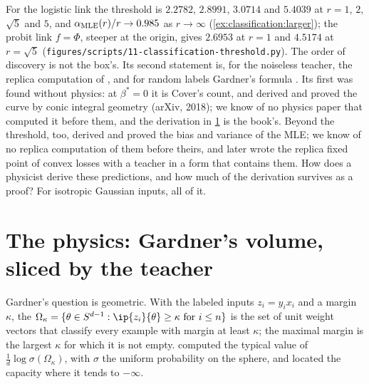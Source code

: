 \begin{refsection}
For the logistic link the threshold is $2.2782$, $2.8991$, $3.0714$ and $5.4039$ at $r=1$, $2$, $\sqrt5$ and $5$, and $\alpha_{\mathrm{MLE}}(r)/r\to0.985$ as $r\to\infty$ (\cref{ex:classification:larger}); the probit link $f=\Phi$, steeper at the origin, gives $2.6953$ at $r=1$ and $4.5174$ at $r=\sqrt5$ (\texttt{figures/scripts/11-classification-threshold.py}). The order of discovery is not the box's. Its second statement is, for the noiseless teacher, the replica computation of \textcite{OpperEtAl1990}, and for random labels Gardner's formula \parencite{Gardner1988}. Its first was found without physics: at $\beta^*=0$ it is Cover's count, and \textcite{CandesSur2020} derived and proved the curve by conic integral geometry (arXiv, 2018); we know of no physics paper that computed it before them, and the derivation in \cref{sec:classification:physics} is the book's. Beyond the threshold, too, \textcite{SurCandes2019} derived and proved the bias and variance of the MLE; we know of no replica computation of them before theirs, and \textcite{AubinEtAl2020} later wrote the replica fixed point of convex losses with a teacher in a form that contains them. How does a physicist derive these predictions, and how much of the derivation survives as a proof? For isotropic Gaussian inputs, all of it.

\section{The physics: Gardner's volume, sliced by the teacher}\label{sec:classification:physics}

Gardner's question is geometric. With the labeled inputs $z_i=y_ix_i$ and a margin $\kappa$, the  $\Omega_\kappa=\{\theta\in S^{d-1}:\ip{z_i}{\theta}\ge\kappa\text{ for }i\le n\}$ is the set of unit weight vectors that classify every example with margin at least $\kappa$; the maximal margin is the largest $\kappa$ for which it is not empty. \Textcite{Gardner1988} computed the typical value of $\frac1d\log\sigma(\Omega_\kappa)$, with $\sigma$ the uniform probability on the sphere, and located the capacity where it tends to $-\infty$.


\end{refsection}

